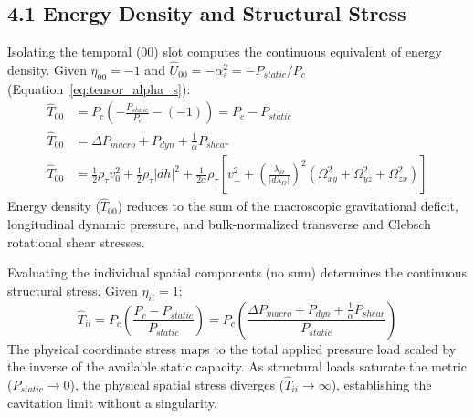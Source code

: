 
\subsection*{4.1 Energy Density and Structural Stress}
Isolating the temporal ($00$) slot computes the continuous equivalent of energy density. Given $\eta_{00} = -1$ and $\hat{U}_{00} = -\alpha_s^2 = -P_{static}/P_c$ (Equation~\ref{eq:tensor_alpha_s}): %
\begin{align}
    \hat{T}_{00} &= P_c \left( -\frac{P_{static}}{P_c} - (-1) \right) = P_c - P_{static} \nonumber \\ %
    \hat{T}_{00} &= \Delta P_{macro} + P_{dyn} + \frac{1}{\alpha}P_{shear} \nonumber \\ %
    \hat{T}_{00} &= \frac{1}{2}\rho_\tau v_0^2 + \frac{1}{2}\rho_\tau |dh|^2 + \frac{1}{2\alpha}\rho_\tau \left[ v_\perp^2 + \left(\frac{\lambda_\Omega}{|d\lambda_\Omega|}\right)^2 \left(\Omega_{xy}^2 + \Omega_{yz}^2 + \Omega_{zx}^2\right) \right] \label{eq:energy_density_proof} %
\end{align}
Energy density ($\hat{T}_{00}$) reduces to the sum of the macroscopic gravitational deficit, longitudinal dynamic pressure, and bulk-normalized transverse and Clebsch rotational shear stresses. %

Evaluating the individual spatial components (no sum) determines the continuous structural stress. Given $\eta_{ii} = 1$:
\begin{equation}
    \hat{T}_{ii} = P_c \left( \frac{P_c - P_{static}}{P_{static}} \right) = P_c \left( \frac{\Delta P_{macro} + P_{dyn} + \frac{1}{\alpha}P_{shear}}{P_{static}} \right) \label{eq:spatial_stress_proof} %
\end{equation}
The physical coordinate stress maps to the total applied pressure load scaled by the inverse of the available static capacity. As structural loads saturate the metric ($P_{static} \to 0$), the physical spatial stress diverges ($\hat{T}_{ii} \to \infty$), establishing the cavitation limit without a singularity.



